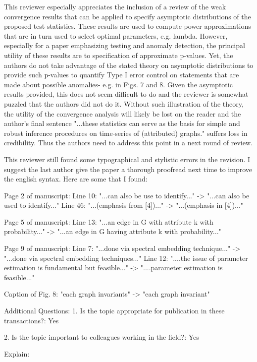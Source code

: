 This reviewer especially appreciates the inclusion of a review of the
weak convergence results that can be applied to specify asymptotic
distributions of the proposed test statistics.  These results are used
to compute power approximations that are in turn used to select
optimal parameters, e.g. lambda.  However, especially for a paper
emphasizing testing and anomaly detection, the principal utility of
these results are to specification of approximate p-values. Yet, the
authors do not take advantage of the stated theory on asymptotic
distributions to provide such p-values to quantify Type I error
control on statements that are made about possible anomalies- e.g. in
Figs. 7 and 8. Given the asymptotic results provided, this does not
seem difficult to do and the reviewer is somewhat puzzled that the
authors did not do it. Without such illustration of the theory, the
utility of the convergence analysis will likely be lost on the reader
and the author's final sentence "...these statistics can serve as the
basis for simple and robust inference procedures on time-series of
(attributed) graphs." suffers loss in credibility. Thus the authors
need to address this point in a next round of review.

This reviewer still found some typographical and stylistic errors in
the revision. I suggest the last author give the paper a thorough
proofread next time to improve the english syntax.  Here are some that
I found:

Page 2 of manuscript: 
Line 10: "...can also be use to identify..." ->
"...can also be used to identify..."  
Line 46: "...(emphasis from
[4])..." -> "...(emphasis in [4])..."

Page 5 of manuscript: 
Line 13: "...an edge in G with attribute k with
probability..." -> "...an edge in G having attribute k with
probability..."

Page 9 of manuscript:
Line 7: "...done via spectral embedding technique..." ->  
"...done via spectral embedding techniques..."
Line 12: "....the issue of parameter estimation is fundamental but
feasible..." -> "....parameter estimation is  feasible..."

Caption of Fig. 8: "each graph invariants" -> "each graph invariant"

Additional Questions:
1. Is the topic appropriate for publication in these transactions?: Yes

2. Is the topic important to colleagues working in the field?: Yes

Explain:

